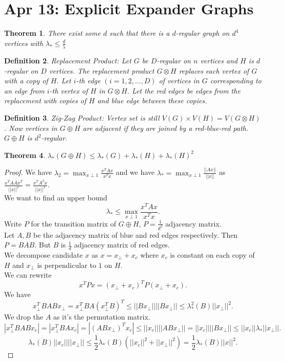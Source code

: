 \documentclass[a4paper]{article}
\newtheorem{thm}{Theorem}[section]
\newtheorem{defn}[thm]{Definition}
\begin{document}
\section{Apr 13: Explicit Expander Graphs}
\begin{thm}
    There exist some $d$ such that there is a $d$-regular graph on $d^4$ vertices with $\lambda_*\leq \frac{d}{5}$
\end{thm}
\begin{defn}
    Replacement Product: Let $G$ be $D$-regular on $n$ vertices and $H$ is $d$-regular on $D$ vertices. The replacement product $G \otimes H$ replaces each vertex of $G$ with a copy of $H$. Let $i$-th edge $(i=1,2,...,D)$ of vertices in $G$ corresponding to an edge from $i$-th vertex of $H$ in $G\otimes H$. Let the red edges be edges from the replacement with copies of $H$ and blue edge between these copies. 
\end{defn}
\begin{defn}
    Zig-Zag Product: Vertex set is still $V(G)\times V(H)=V(G\otimes H)$. Now vertices in $G\oplus H$ are adjacent if they are joined by a red-blue-red path. $G\oplus H$ is $d^2$-regular. 
\end{defn}
\begin{thm}
    $\lambda_*(G\oplus H)\leq \lambda_*(G)+\lambda_*(H)+\lambda_*(H)^2$
\end{thm}
\begin{proof}
    We have $\lambda_2=\max_{x\perp 1}\frac{x^T Ax}{x^Tx}$ and we have $\lambda_*=\max_{x\perp 1}\frac{||Ax||}{||x||}$ as $\frac{x^T AA x^T}{||x||^2}=\frac{x^T A^2 x}{||x||^2}$. \\
    We want to find an upper bound 
    \[
    \lambda_*\leq \max_{x\perp 1}\frac{x^T A x}{x^Tx}
    .\] 
    Write $P$ for the transition matrix of $G\oplus H$, $P=\frac{1}{d^2}$ adjacency matrix. \\
    Let $A,B$ be the adjacency matrix of blue and red edges respectively. Then $P=BAB$. But $B$ is $\frac{1}{d}$ adjacency matrix of red edges. \\
    We decompose candidate $x$ as $x=x_\perp+x_c$ where $x_c$ is constant on each copy of $H$ and $x_\perp$ is perpendicular to $1$ on $H$. \\
    We can rewrite 
    \[
    x^T P x=(x_\perp+x_c)^T P (x_\perp+x_c)
    .\] 
    We have 
    \[
    x_\perp^T BABx_\perp = x_\perp ^T BA(x_\perp^TB)^T\leq ||Bx_\perp||||Bx_\perp||\leq \lambda_*^2(B)||x_\perp||^2
    .\] 
    We drop the $A$ as it's the permutation matrix. \\
    \[
    |x_\perp^T BABx_c|=|x_\perp^T BAx_c|=|(ABx_\perp)^Tx_c|\leq ||x_c||||ABx_\perp||=||x_c||||Bx_\perp||\leq ||x_c||\lambda_*||x_\perp||
    .\] 
    \[
        \lambda_*(B)||x_c||||x_\perp||\leq \frac{1}{2}\lambda_*(B)(||x_c||^2+||x_\perp||^2)=\frac{1}{2}\lambda_*(B)||x||^2
    .\] 
\end{proof}
\end{document}
